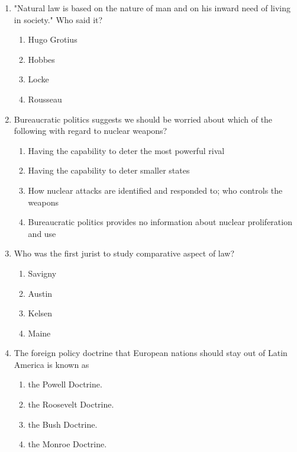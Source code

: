 \documentclass[12pt]{article}
\begin{document}
\begin{enumerate}[label=\arabic*.]
\begin{enumerate}[label=(\alph*)]
    \item Plaintiff has to prove special damages, unless it falls into slander per se.
    \item The statement does not have to be published if it constitutes slander per se.
    \item There are four slander per se categories.
\end{enumerate}
\item "Natural law is based on the nature of man and on his inward need of living in society." Who said it?
\begin{enumerate}[label=(\alph*)]
    \item Hugo Grotius
    \item Hobbes
    \item Locke
    \item Rousseau
\end{enumerate}
\item Bureaucratic politics suggests we should be worried about which of the following with regard to nuclear weapons?
\begin{enumerate}[label=(\alph*)]
    \item Having the capability to deter the most powerful rival
    \item Having the capability to deter smaller states
    \item How nuclear attacks are identified and responded to; who controls the weapons
    \item Bureaucratic politics provides no information about nuclear proliferation and use
\end{enumerate}
\item Who was the first jurist to study comparative aspect of law?
\begin{enumerate}[label=(\alph*)]
    \item Savigny
    \item Austin
    \item Kelsen
    \item Maine
\end{enumerate}
\item The foreign policy doctrine that European nations should stay out of Latin America is known as
\begin{enumerate}[label=(\alph*)]
    \item the Powell Doctrine.
    \item the Roosevelt Doctrine.
    \item the Bush Doctrine.
    \item the Monroe Doctrine.

\end{enumerate}
\end{enumerate}
\end{document}
